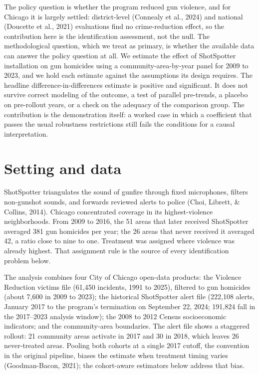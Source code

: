 \documentclass[12pt]{article}
\begin{document}
The policy question is whether the program reduced gun violence, and for Chicago it is
largely settled: district-level (Connealy et al., 2024) and national (Doucette et al.,
2021) evaluations find no crime-reduction effect, so the contribution here is the
identification assessment, not the null. The methodological question, which we treat as
primary, is whether the available data can answer the policy question at all. We estimate
the effect of ShotSpotter installation on gun homicides using a community-area-by-year
panel for 2009 to 2023, and we hold each estimate against the assumptions its design
requires. The headline difference-in-differences estimate is
positive and significant. It does not survive correct modeling of the outcome, a test of
parallel pre-trends, a placebo on pre-rollout years, or a check on the adequacy of the
comparison group. The contribution is the demonstration itself: a worked case in which a
coefficient that passes the usual robustness restrictions still fails the conditions for a
causal interpretation.

\section{Setting and data}

ShotSpotter triangulates the sound of gunfire through fixed microphones, filters
non-gunshot sounds, and forwards reviewed alerts to police (Choi, Librett, \& Collins,
2014). Chicago concentrated coverage in its highest-violence neighborhoods. From 2009 to
2016, the 51 areas that later received ShotSpotter averaged 381 gun homicides per year;
the 26 areas that never received it averaged 42, a ratio close to nine to one. Treatment
was assigned where violence was already highest. That assignment rule is the source of
every identification problem below.

The analysis combines four City of Chicago open-data products: the Violence Reduction
victims file (61,450 incidents, 1991 to 2025), filtered to gun homicides (about 7,600 in
2009 to 2023); the historical ShotSpotter alert file (222,108 alerts, January 2017 to the
program's termination on September 22, 2024; 191,824 fall in the 2017--2023 analysis
window); the 2008 to 2012 Census socioeconomic indicators; and the community-area
boundaries. The alert file shows a staggered rollout: 21 community areas activate in 2017
and 30 in 2018, which leaves 26 never-treated areas. Pooling both cohorts at a single 2017
cutoff, the convention in the original pipeline, biases the estimate when treatment timing
varies (Goodman-Bacon, 2021); the cohort-aware estimators below address that bias.
\end{document}
